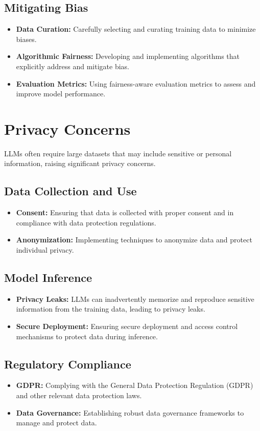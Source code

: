 \subsection{Mitigating Bias}
\begin{itemize}
    \item \textbf{Data Curation:} Carefully selecting and curating training data to minimize biases.
    \item \textbf{Algorithmic Fairness:} Developing and implementing algorithms that explicitly address and mitigate bias.
    \item \textbf{Evaluation Metrics:} Using fairness-aware evaluation metrics to assess and improve model performance.
\end{itemize}

\section{Privacy Concerns}
LLMs often require large datasets that may include sensitive or personal information, raising significant privacy concerns.

\subsection{Data Collection and Use}
\begin{itemize}
    \item \textbf{Consent:} Ensuring that data is collected with proper consent and in compliance with data protection regulations.
    \item \textbf{Anonymization:} Implementing techniques to anonymize data and protect individual privacy.
\end{itemize}

\subsection{Model Inference}
\begin{itemize}
    \item \textbf{Privacy Leaks:} LLMs can inadvertently memorize and reproduce sensitive information from the training data, leading to privacy leaks.
    \item \textbf{Secure Deployment:} Ensuring secure deployment and access control mechanisms to protect data during inference.
\end{itemize}

\subsection{Regulatory Compliance}
\begin{itemize}
    \item \textbf{GDPR:} Complying with the General Data Protection Regulation (GDPR) and other relevant data protection laws.
    \item \textbf{Data Governance:} Establishing robust data governance frameworks to manage and protect data.
\end{itemize}

